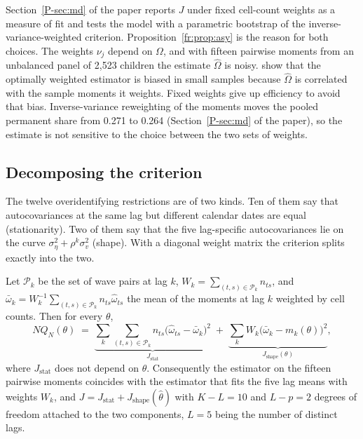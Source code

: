 Section~\ref{P-sec:md} of the paper reports $J$ under fixed cell-count
weights as a measure of fit and tests the model with a parametric
bootstrap of the inverse-variance-weighted criterion. Proposition~\ref{fr:prop:asy} is the reason for both choices. The
weights $\nu_j$ depend on $\Omega$, and with fifteen pairwise moments
from an unbalanced panel of 2,523 children the estimate $\hat\Omega$ is
noisy. \citet{AltonjiSegal1996} show that the optimally weighted
estimator is biased in small samples because $\hat\Omega$ is correlated
with the sample moments it weights. Fixed weights give up efficiency to
avoid that bias. Inverse-variance reweighting of the
moments moves the pooled permanent share from 0.271 to 0.264 (Section~\ref{P-sec:md} of the paper), so the estimate is not
sensitive to the choice between the two sets of weights.

\subsection{Decomposing the criterion}

The twelve overidentifying restrictions are of two kinds. Ten of them
say that autocovariances at the same lag but different calendar dates
are equal (stationarity). Two of them say that the five lag-specific
autocovariances lie on the curve $\sigma^2_\eta + \rho^k\sigma^2_v$
(shape). With a diagonal weight matrix the criterion splits exactly
into the two.

\begin{proposition}
\label{fr:prop:Jsplit}
Let $\mathcal P_k$ be the set of wave pairs at lag $k$,
$W_k = \sum_{(t,s)\in\mathcal P_k}n_{ts}$, and
$\bar\omega_k = W_k^{-1}\sum_{(t,s)\in\mathcal P_k}n_{ts}\hat\omega_{ts}$
the mean of the moments at lag $k$ weighted by cell counts. Then for
every $\theta$,
\begin{equation}
N Q_N(\theta) \;=\; \underbrace{\sum_{k}\sum_{(t,s)\in\mathcal P_k} n_{ts}\big(\hat\omega_{ts} - \bar\omega_k\big)^2}_{J_{\mathrm{stat}}}
\;+\; \underbrace{\sum_{k} W_k\big(\bar\omega_k - m_k(\theta)\big)^2}_{J_{\mathrm{shape}}(\theta)} ,
\label{fr:eq:Jsplit}
\end{equation}
where $J_{\mathrm{stat}}$ does not depend on $\theta$. Consequently the
estimator on the fifteen pairwise moments coincides with the estimator
that fits the five lag means with weights $W_k$, and
$J = J_{\mathrm{stat}} + J_{\mathrm{shape}}(\hat\theta)$ with
$K - L = 10$ and $L - p = 2$ degrees of freedom attached to the two
components, $L = 5$ being the number of distinct lags.
\end{proposition}

